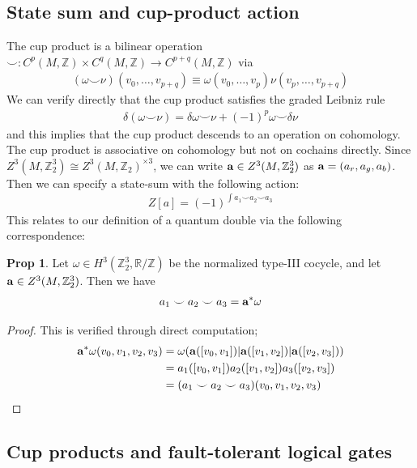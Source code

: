\documentclass{article}
\theoremstyle{definition}
\theoremstyle{definition}
\newtheorem{prop}{Prop}
\newcommand{\Z}{\mathbb Z}
\newcommand{\R}{\mathbb R}
\begin{document}
\subsection{State sum and cup-product action}
The cup product is a bilinear operation $\smile: C^p(M, \Z) \times C^q(M, \Z)
\to C^{p+q}(M, \Z)$ via
\begin{align}\label{eq:cup-product-definition}
  (\omega \smile \nu)(v_0, \ldots, v_{p+q}) \equiv \omega(v_0, \ldots, v_p)\nu(v_p, \ldots, v_{p+q})
\end{align}
We can verify directly that the cup product satisfies the graded Leibniz rule
\begin{align}\label{eq:cup-product-liebniz-rule}
\delta(\omega \smile \nu) = \delta\omega \smile \nu + (-1)^{p}\omega \smile \delta \nu
\end{align}
and this implies that the cup product descends to an operation on cohomology.
The cup product is associative on cohomology but not on cochains directly.
Since $Z^3(M, \Z_2^3) \cong Z^3(M,\Z_2)^{\times 3}$, we can write $\vb a \in
Z^3(M, \Z_2^3)$ as $\vb a = (a_r, a_g, a_b)$. Then we can specify a state-sum
with the following action:
\begin{align}
  Z[a] = (-1)^{\int a_1 \smile a_2 \smile a_3}
\end{align}
This relates to our definition of a quantum double via the following correspondence:
\begin{prop}\label{prop:equivalence_cup_typeIII_cocycle}
  Let $\omega \in H^3(\Z_2^3, \R/\Z)$ be the normalized type-III cocycle, and
  let $\vb a \in Z^3(M, \Z_2^3)$. Then we have
\begin{align}
  a_1 \smile a_2 \smile a_3 = \vb a^* \omega
\end{align}

\begin{proof}
This is verified through direct computation;
\begin{align}
  \vb a^*\omega(v_0, v_1, v_2, v_3) &= \omega(\vb a([v_0, v_1]) | \vb a([v_1, v_2]) | \vb a([v_2, v_3])) \notag \\
                                &= a_1([v_0, v_1])a_2([v_1, v_2])a_3([v_2, v_3]) \notag \\
  &= (a_1 \smile a_2 \smile a_3)(v_0, v_1, v_2, v_3)
\end{align}
\end{proof}
\end{prop}


\subsection{Cup products and fault-tolerant logical gates}
\end{document}
